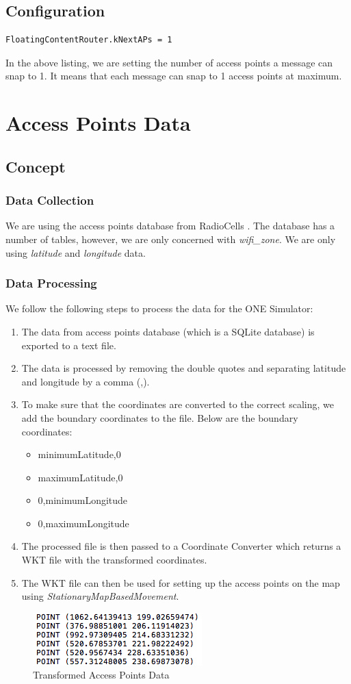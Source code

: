 \subsection{Configuration}
\begin{lstlisting}[language=bash]
FloatingContentRouter.kNextAPs = 1
\end{lstlisting}
In the above listing, we are setting the number of access points a message can snap to 1. It means that each message can snap to 1 access points at maximum.
\newpage
\section{Access Points Data}
\subsection{Concept}
\subsubsection{Data Collection}
We are using the access points database from RadioCells \cite{wifi-data}. The database has a number of tables, however, we are only concerned with \textit{wifi\_zone}. We are only using \textit{latitude} and \textit{longitude} data.
\subsubsection{Data Processing}
We follow the following steps to process the data for the ONE Simulator:
\begin{enumerate}
	\item The data from access points database (which is a SQLite database) \cite{wifi-data} is exported to a text file.
	\item The data is processed by removing the double quotes and separating latitude and longitude by a comma (,).
	\item To make sure that the coordinates are converted to the correct scaling, we add the boundary coordinates to the file. Below are the boundary coordinates:
	\begin{itemize}
		\item minimumLatitude,0
		\item maximumLatitude,0
		\item 0,minimumLongitude
		\item 0,maximumLongitude
	\end{itemize}
	\item The processed file is then passed to a Coordinate Converter which returns a WKT file with the transformed coordinates.
	\item The WKT file can then be used for setting up the access points on the map using \textit{StationaryMapBasedMovement}.
\end{enumerate}
\begin{figure}[h]
	\centering
	\includegraphics{./figures/access-points-data}
	\caption{Transformed Access Points Data}
\end{figure}

